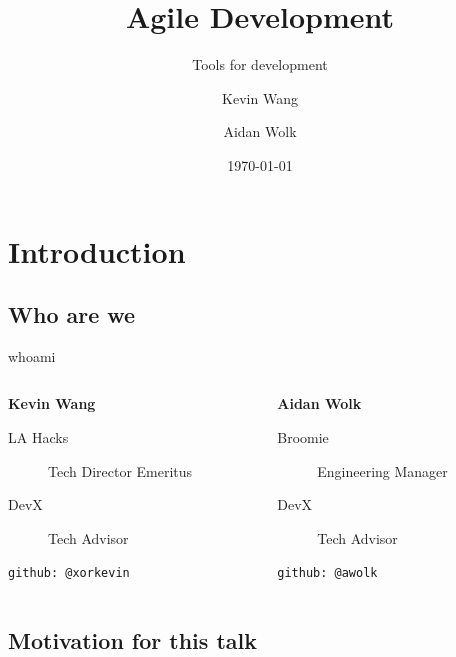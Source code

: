 \documentclass{beamer}
\title{Agile Development}
\subtitle{Tools for development}
\author{Kevin Wang \and Aidan Wolk}
\date{\today}
\institute{DevX}
\begin{document}
\maketitle

\section{Introduction}

\subsection{Who are we}

\begin{frame}{whoami}
  \begin{columns}
    \begin{column}{0.48\textwidth}
      \textbf{\Large Kevin Wang}

      \begin{description}
        \item[LA Hacks] Tech Director Emeritus
        \item[DevX] Tech Advisor
      \end{description}

      \texttt{\tiny github: @xorkevin}
    \end{column}
    \begin{column}{0.48\textwidth}
      \textbf{\Large Aidan Wolk}

      \begin{description}
        \item[Broomie] Engineering Manager
        \item[DevX] Tech Advisor
      \end{description}

      \texttt{\tiny github: @awolk}
    \end{column}
  \end{columns}
\end{frame}

\subsection{Motivation for this talk}
\end{document}
